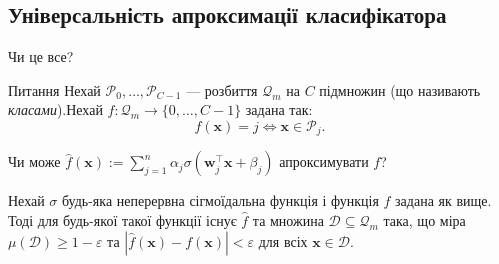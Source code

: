 \documentclass{zkdl-presentation-template}
\begin{document}
    \subsection{Універсальність апроксимації класифікатора}
    \begin{frame}{Чи це все?}
        \begin{alertblock}{Питання}
            Нехай $\mathcal{P}_0,\dots,\mathcal{P}_{C-1}$ ---
            розбиття $\mathcal{Q}_m$ на $C$ підмножин (що називають \textit{класами}).\pause Нехай
            $f: \mathcal{Q}_m \to \{0,\dots,C-1\}$ задана так:
            \begin{equation*}
                f(\boldsymbol{x}) = j \iff \boldsymbol{x} \in \mathcal{P}_j.
            \end{equation*}

            \pause Чи може $\hat{f}(\boldsymbol{x}) := \sum_{j=1}^n
            \alpha_j\sigma(\boldsymbol{w}_j^{\top}\boldsymbol{x} + \beta_j)$ апроксимувати 
            $f$?\pause
        \end{alertblock}

        \begin{theorem}
            Нехай $\sigma$ будь-яка неперервна сігмоїдальна функція і функція
            $f$ задана як вище. Тоді для будь-якої такої функції існує $\hat{f}$
            та множина $\mathcal{D} \subseteq \mathcal{Q}_m$ така, що міра
            $\mu(\mathcal{D}) \geq 1-\varepsilon$ та $|\hat{f}(\boldsymbol{x}) -
            f(\boldsymbol{x})| < \varepsilon$ для всіх $\boldsymbol{x} \in \mathcal{D}$.
        \end{theorem}
    \end{frame}
\end{document}
